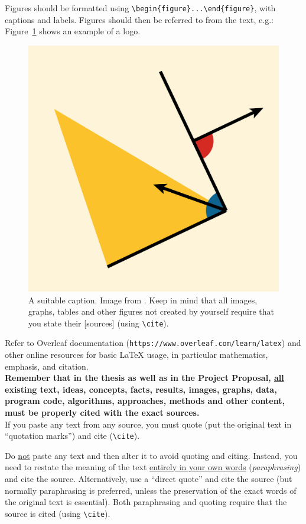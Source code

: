 \documentclass[a4paper,12pt]{Classes/RoboticsLaTeX}
\begin{document}
	Figures should be formatted using \verb+\begin{figure}...\end{figure}+, with captions and labels. Figures should then be referred to from the text, e.g.: Figure~\ref{fig:penrose} shows an example of a logo.
	\begin{figure}
		\centering
		\includegraphics[width=0.3\linewidth]{Figures/penrose.png}
		\caption{A suitable caption. Image from \cite{10.1145/3386569.3392375}. Keep in mind that all images, graphs, tables and other figures not created by yourself require that you state their {[sources]} (using \texttt{\textbackslash cite}).}
		\label{fig:penrose}
	\end{figure}
	
	\vspace{2ex} Refer to Overleaf documentation (\verb#https://www.overleaf.com/learn/latex#) and other online resources for basic LaTeX usage, in particular mathematics, emphasis, and citation.\\

	\textbf{Remember that in the thesis as well as in the Project Proposal, \underline{all} existing  text, ideas, concepts, facts, results, images, graphs, data, program code, algorithms, approaches, methods and other content, must be properly cited with the exact sources. }\\
	
	If you paste any text from any source, you must quote (put the original text in ``quotation marks'') and cite (\texttt{\textbackslash cite}). 
	
	Do \underline{not} paste any text and then alter it to avoid quoting and citing. Instead, you need to restate the meaning of the text \underline{entirely in your own words} (\textit{paraphrasing}) and cite the source. Alternatively, use a ``direct quote'' and cite the source (but normally paraphrasing is preferred, unless the preservation of the exact words of the original text is essential). Both paraphrasing and quoting require that the source is cited (using \texttt{\textbackslash cite}).\\
	
\end{document}
